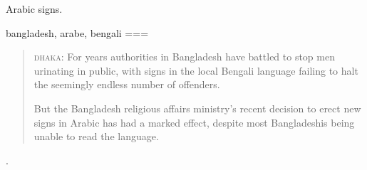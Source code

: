 Arabic signs.

bangladesh, arabe, bengali
===
\begin{quote}
\textsc{dhaka}: For years authorities in Bangladesh have battled to stop men urinating in public, with signs in the local Bengali language failing to halt the seemingly endless number of offenders.

But the Bangladesh religious affairs ministry's recent decision to erect new signs in Arabic has had a marked effect, despite most Bangladeshis being unable to read the language.
\end{quote}
\nocite{2015b}.